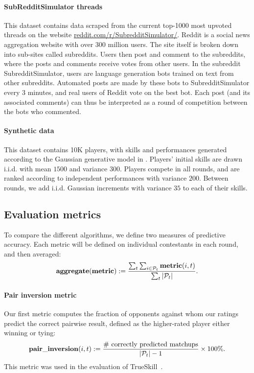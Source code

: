 \paragraph{SubRedditSimulator threads}
This dataset contains data scraped from the current top-1000 most upvoted threads on the website \url{reddit.com/r/SubredditSimulator/}. Reddit is a social news aggregation website with over 300 million users. The site itself is broken down into sub-sites called subreddits. Users then post and comment to the subreddits, where the posts and comments receive votes from other users. In the subreddit SubredditSimulator, users are language generation bots trained on text from other subreddits. Automated posts are made by these bots to SubredditSimulator every 3 minutes, and real users of Reddit vote on the best bot. Each post (and its associated comments) can thus be interpreted as a round of competition between the bots who commented. 

\paragraph{Synthetic data}
This dataset contains 10K players, with skills and performances generated according to the Gaussian generative model in . Players' initial skills are drawn i.i.d. with mean $1500$ and variance $300$. Players compete in all rounds, and are ranked according to independent performances with variance $200$. Between rounds, we add i.i.d. Gaussian increments with variance $35$ to each of their skills.

\subsection{Evaluation metrics}
\label{sec:metrics}
To compare the different algorithms, we define two measures of predictive accuracy. Each metric will be defined on individual contestants in each round, and then averaged:
\[\mathrm{\bf aggregate(metric)} := \frac{\sum_t \sum_{i\in\mathcal P_t} \mathrm{\bf metric}(i,t)}{\sum_t |\mathcal P_t|}.\]

\paragraph{Pair inversion metric~\cite{HMG06}}
Our first metric computes the fraction of opponents against whom our ratings predict the correct pairwise result, defined as the higher-rated player either winning or tying: 
\[\mathrm{\bf pair\_inversion}(i,t) := \frac{\text{\# correctly predicted matchups}}{|\mathcal P_t|-1} \times 100\%.\]
This metric was used in the evaluation of TrueSkill~\cite{HMG06}.


